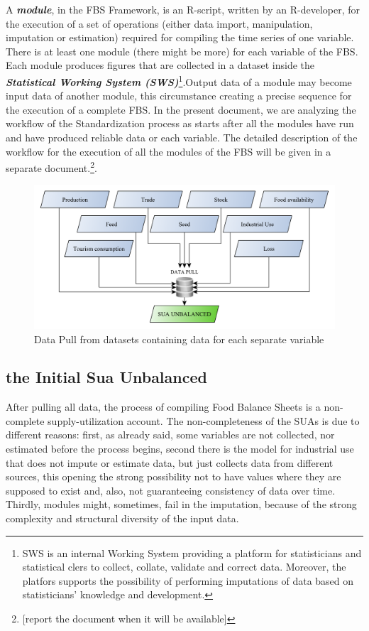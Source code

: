 \documentclass[]{article}
\let\rmarkdownfootnote\footnote%
\def\footnote{\protect\rmarkdownfootnote}
\begin{document}
A \textbf{\emph{module}}, in the FBS Framework, is an R-script, written
by an R-developer, for the execution of a set of operations (either data
import, manipulation, imputation or estimation) required for compiling
the time series of one variable. There is at least one module (there
might be more) for each variable of the FBS. Each module produces
figures that are collected in a dataset inside the
\textbf{\emph{Statistical Working System (SWS)}}\footnote{SWS is an
  internal Working System providing a platform for statisticians and
  statistical clers to collect, collate, validate and correct data.
  Moreover, the platfors supports the possibility of performing
  imputations of data based on statisticians' knowledge and development.}.Output
data of a module may become input data of another module, this
circumstance creating a precise sequence for the execution of a complete
FBS. In the present document, we are analyzing the workflow of the
Standardization process as starts after all the modules have run and
have produced reliable data or each variable. The detailed description
of the workflow for the execution of all the modules of the FBS will be
given in a separate document.\footnote{{[}report the document when it
  will be available{]}}.

\begin{figure}[htbp]
\centering
\includegraphics{images/01_pulldata.pdf}
\caption{\label{fig:f1}Data Pull from datasets containing data for each
separate variable}
\end{figure}

\subsection*{the Initial Sua
Unbalanced}\label{the-initial-sua-unbalanced}

After pulling all data, the process of compiling Food Balance Sheets is
a non-complete supply-utilization account. The non-completeness of the
SUAs is due to different reasons: first, as already said, some variables
are not collected, nor estimated before the process begins, second there
is the model for industrial use that does not impute or estimate data,
but just collects data from different sources, this opening the strong
possibility not to have values where they are supposed to exist and,
also, not guaranteeing consistency of data over time. Thirdly, modules
might, sometimes, fail in the imputation, because of the strong
complexity and structural diversity of the input data.
\end{document}
